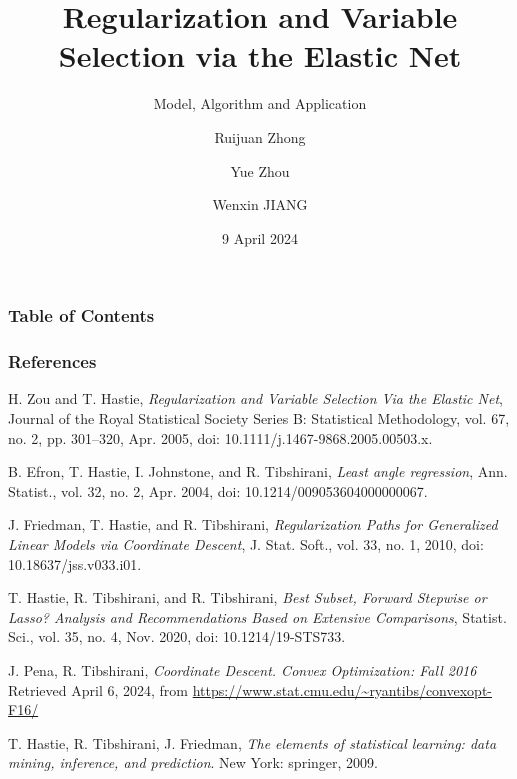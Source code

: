 \documentclass{beamer}
\title[GLM Net] %
{Regularization and Variable Selection via the Elastic Net}
\subtitle{Model, Algorithm and Application}
\author[] %
{Ruijuan Zhong \and Yue Zhou \and Wenxin JIANG} %
\institute[BIOS] %
{
  Department of Biostatistics\\
  City University of Hong Kong
}
\date[April 2024] %
{9 April 2024}
\begin{document}
\frame{\titlepage}
\begin{frame}
\frametitle{Table of Contents}
\tableofcontents
\end{frame}







\begin{frame}[allowframebreaks]
\frametitle{References}

\begin{thebibliography}{99}
\small
{}
H. Zou and T. Hastie, \emph{Regularization and Variable Selection Via the Elastic Net}, Journal of the Royal Statistical Society Series B: Statistical Methodology, vol. 67, no. 2, pp. 301–320, Apr. 2005, doi: 10.1111/j.1467-9868.2005.00503.x.

B. Efron, T. Hastie, I. Johnstone, and R. Tibshirani, \emph{Least angle regression}, Ann. Statist., vol. 32, no. 2, Apr. 2004, doi: 10.1214/009053604000000067.

J. Friedman, T. Hastie, and R. Tibshirani, \emph{Regularization Paths for Generalized Linear Models via Coordinate Descent}, J. Stat. Soft., vol. 33, no. 1, 2010, doi: 10.18637/jss.v033.i01.

T. Hastie, R. Tibshirani, and R. Tibshirani, \emph{Best Subset, Forward Stepwise or Lasso? Analysis and Recommendations Based on Extensive Comparisons}, Statist. Sci., vol. 35, no. 4, Nov. 2020, doi: 10.1214/19-STS733.

J. Pena, R. Tibshirani, \emph{Coordinate Descent. Convex Optimization: Fall 2016} Retrieved April 6, 2024, from \url{https://www.stat.cmu.edu/~ryantibs/convexopt-F16/}

T. Hastie, R. Tibshirani, J. Friedman, \emph{The elements of statistical learning: data mining, inference, and prediction}. New York: springer, 2009.
\end{thebibliography}

\end{frame}
\end{document}
